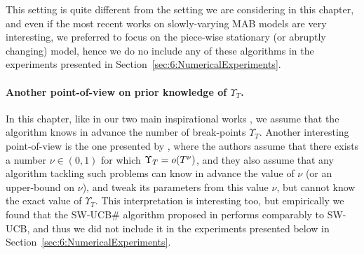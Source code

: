 This setting is quite different from the setting we are considering in this chapter, and even if the most recent works on slowly-varying MAB models are very interesting, we preferred to focus on the piece-wise stationary (or abruptly changing) model,
hence we do no include any of these algorithms in the experiments presented in Section~\ref{sec:6:NumericalExperiments}.


\paragraph{Another point-of-view on prior knowledge of $\Upsilon_T$.}
%
In this chapter, like in our two main inspirational works \cite{CaoZhenKvetonXie18,LiuLeeShroff17},
we assume that the algorithm knows in advance the number of break-points $\Upsilon_T$.
Another interesting point-of-view is the one presented by \cite{WeiSrivastava18Abruptly,WeiSrivastava18Distributed},
where the authors assume that there exists a number $\nu\in(0,1)$ for which $\Upsilon_T = \mathop{}\mathopen{}o\mathopen{}\left(T^{\nu}\right)$,
and they also assume that any algorithm tackling such problems can know in advance the value of $\nu$ (or an upper-bound on $\nu$), and tweak its parameters from this value $\nu$, but cannot know the exact value of $\Upsilon_T$.
%
This interpretation is interesting too,
but empirically we found that the SW-UCB\# algorithm proposed in \cite{WeiSrivastava18Abruptly} performs comparably to SW-UCB, and thus we did not include it in the experiments presented below in Section~\ref{sec:6:NumericalExperiments}.
%



